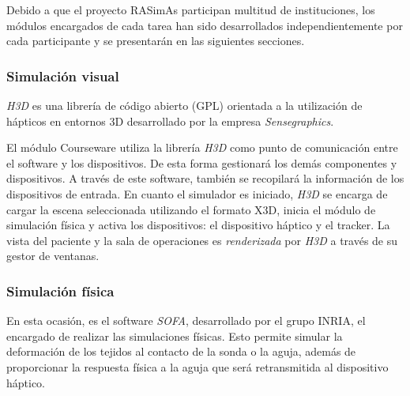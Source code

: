
Debido a que el proyecto \ac{RASimAs} participan multitud de instituciones, los módulos encargados de cada tarea han sido desarrollados independientemente por cada participante y se presentarán en las siguientes secciones.


\subsubsection{Simulación visual}

\emph{H3D}\cite{sensegraphics2012open} es una librería de código abierto (\ac{GPL})  orientada a la utilización de hápticos en entornos 3D desarrollado por la empresa \emph{Sensegraphics}. 

El módulo \ac{Courseware} utiliza la librería \emph{H3D} como punto de comunicación entre el software y los dispositivos. De esta forma gestionará los demás componentes y dispositivos. A través de este software, también se recopilará la información de los dispositivos de entrada.
En cuanto el simulador es iniciado, \emph{H3D} se encarga de cargar la escena seleccionada utilizando el formato \ac{X3D}, inicia el módulo de simulación física y activa los dispositivos:  el dispositivo háptico y el \ac{tracker}. La vista del paciente y la sala de operaciones es \emph{renderizada} por \emph{H3D} a través de su gestor de ventanas.

\subsubsection{Simulación física}

En esta ocasión, es el software \emph{SOFA}\cite{sofaweb}, desarrollado por el grupo \ac{INRIA}, el encargado de realizar las simulaciones físicas. Esto permite simular la deformación de los tejidos al contacto de la sonda o la aguja, además de proporcionar la respuesta física a la aguja que será retransmitida al dispositivo háptico.

